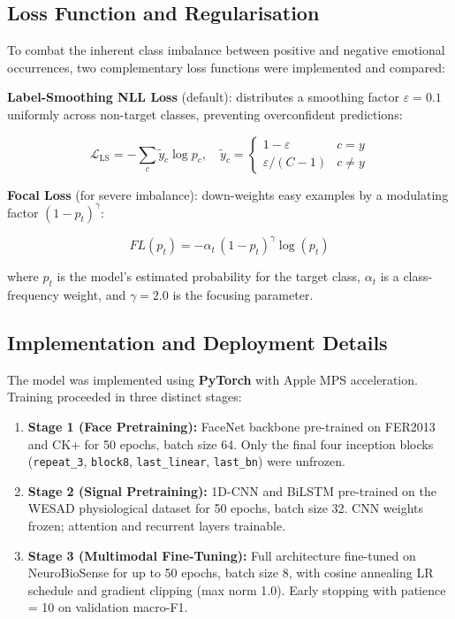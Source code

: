 \documentclass[12pt, a4paper]{article}
\begin{document}
\subsection{Loss Function and Regularisation}

To combat the inherent class imbalance between positive and negative emotional occurrences, two complementary loss functions were implemented and compared:

\textbf{Label-Smoothing NLL Loss} (default): distributes a smoothing factor $\varepsilon = 0.1$ uniformly across non-target classes, preventing overconfident predictions:

\begin{equation}
    \mathcal{L}_{\text{LS}} = -\sum_{c} \tilde{y}_c \log p_c, \quad \tilde{y}_c = \begin{cases} 1 - \varepsilon & c = y \\ \varepsilon/(C-1) & c \ne y \end{cases}
\end{equation}

\textbf{Focal Loss} (for severe imbalance): down-weights easy examples by a modulating factor $(1-p_t)^\gamma$:

\begin{equation}
    FL(p_t) = -\alpha_t\,(1 - p_t)^\gamma \log(p_t)
\end{equation}

where $p_t$ is the model's estimated probability for the target class, $\alpha_t$ is a class-frequency weight, and $\gamma = 2.0$ is the focusing parameter.

\subsection{Implementation and Deployment Details}

The model was implemented using \textbf{PyTorch} with Apple MPS acceleration. Training proceeded in three distinct stages:

\begin{enumerate}
    \item \textbf{Stage 1 (Face Pretraining):} FaceNet backbone pre-trained on FER2013 and CK+ for 50 epochs, batch size 64. Only the final four inception blocks (\texttt{repeat\_3}, \texttt{block8}, \texttt{last\_linear}, \texttt{last\_bn}) were unfrozen.
    \item \textbf{Stage 2 (Signal Pretraining):} 1D-CNN and BiLSTM pre-trained on the WESAD physiological dataset for 50 epochs, batch size 32. CNN weights frozen; attention and recurrent layers trainable.
    \item \textbf{Stage 3 (Multimodal Fine-Tuning):} Full architecture fine-tuned on NeuroBioSense for up to 50 epochs, batch size 8, with cosine annealing LR schedule and gradient clipping (max norm 1.0). Early stopping with patience = 10 on validation macro-F1.
\end{enumerate}
\end{document}
